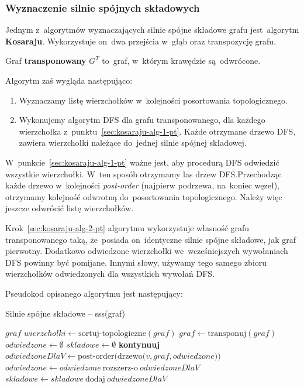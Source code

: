 \documentclass[a4paper,12pt]{mwart}
\newcommand{\algorithmiccontinue}{\textbf{kontynuuj}}
\newcommand{\Continue}{\State \algorithmiccontinue}
\begin{document}

\subsubsection{Wyznaczenie silnie spójnych składowych}

Jednym z~algorytmów wyznaczających silnie spójne składowe grafu jest~algorytm
\textbf{Kosaraju}. Wykorzystuje on~dwa przejścia w~głąb oraz transpozycję
grafu.

Graf \textbf{transponowany} $G^T$ to~graf, w~którym krawędzie są~odwrócone.

Algorytm zaś wygląda następująco:

\begin{enumerate}
\item\label{sec:kosaraju-alg-1-pt} Wyznaczamy listę wierzchołków w~kolejności
  posortowania topologicznego.
\item\label{sec:kosaraju-alg-2-pt} Wykonujemy algorytm DFS dla grafu
  transponowanego, dla każdego wierzchołka
  z~punktu~\ref{sec:kosaraju-alg-1-pt}. Każde otrzymane drzewo DFS, zawiera
  wierzchołki należące do~jednej silnie spójnej składowej.
\end{enumerate}

W~punkcie~\ref{sec:kosaraju-alg-1-pt} ważne jest, aby procedurą DFS odwiedzić
wszystkie wierzchołki. W~ten sposób otrzymamy las drzew DFS.\@ Przechodząc
każde drzewo w~kolejności \emph{post-order} (najpierw podrzewa, na~koniec
węzeł), otrzymamy kolejność odwrotną do~posortowania topologicznego. Należy
więc jeszcze odwrócić listę wierzchołków.

Krok~\ref{sec:kosaraju-alg-2-pt} algorytmu wykorzystuje własność grafu
transponowanego taką, że~posiada on~identyczne silnie spójne składowe, jak graf
pierwotny. Dodatkowo odwiedzone wierzchołki we~wcześniejszych wywołaniach DFS
powinny być pomijane. Innymi słowy, używamy tego samego zbioru wierzchołków
odwiedzonych dla wszystkich wywołań DFS.

Pseudokod opisanego algorytmu jest następujący:

\begin{algorithm}[H]
\caption{Silnie spójne składowe -- sss(graf)}
\begin{algorithmic}[1]
\Require $graf$
\State $wierzcholki \gets \text{sortuj-topologiczne}(graf)$
\State $graf \gets \text{transponuj}(graf)$
\State $odwiedzone \gets \emptyset$ 
\State $skladowe \gets \emptyset$ 
\Continue
\EndIf
\State $odwiedzoneDlaV \gets \text{post-order(drzewo(} v, graf, odwiedzone))$
\State $odwiedzone \gets odwiedzone \ \text{rozszerz-o} \ odwiedzoneDlaV$
\State $skladowe \gets skladowe \ \text{dodaj} \ odwiedzoneDlaV$ 
\EndFor
\State {}
\end{algorithmic}
\end{algorithm}
\end{document}
